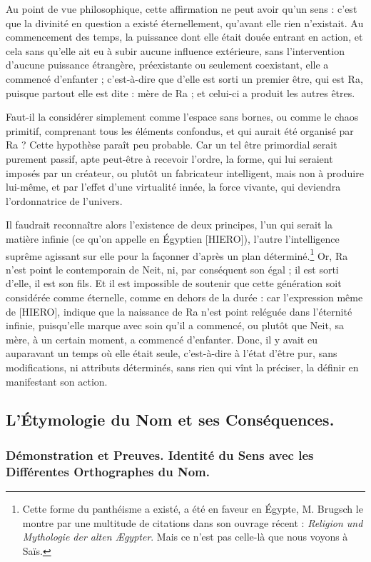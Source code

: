 \documentclass[a4paper, 11pt, oneside]{article}
\begin{document}
Au point de vue philosophique, cette affirmation ne peut avoir qu'un sens : c'est que la divinité en question a existé éternellement, qu'avant elle rien n'existait. Au commencement des temps, la puissance dont elle était douée entrant en action, et cela sans qu'elle ait eu à subir aucune influence extérieure, sans l'intervention d'aucune puissance étrangère, préexistante ou seulement coexistant, elle a commencé d'enfanter ; c'est-à-dire que d'elle est sorti un premier être, qui est Ra, puisque partout elle est dite : mère de Ra ; et celui-ci a produit les autres êtres.

Faut-il la considérer simplement comme l'espace sans bornes, ou comme le chaos primitif, comprenant tous les éléments confondus, et qui aurait été organisé par Ra ? Cette hypothèse paraît peu probable. Car un tel être primordial serait purement passif, apte peut-être à recevoir l'ordre, la forme, qui lui seraient imposés par un créateur, ou plutôt un fabricateur intelligent, mais non à produire lui-même, et par l'effet d'une virtualité innée, la force vivante, qui deviendra l'ordonnatrice de l'univers.

Il faudrait reconnaître alors l'existence de deux principes, l'un qui serait la matière infinie (ce qu'on appelle en Égyptien [HIERO]), l'autre l'intelligence suprême agissant sur elle pour la façonner d'après un plan déterminé.\footnote{Cette forme du panthéisme a existé, a été en faveur en Égypte, M. Brugsch le montre par une multitude de citations dans son ouvrage récent : \emph{Religion und Mythologie der alten Ægypter}. Mais ce n'est pas celle-là que nous voyons à Saïs.} Or, Ra n'est point le contemporain de Neit, ni, par conséquent son égal ; il est sorti d'elle, il est son fils. Et il est impossible de soutenir que cette génération soit considérée comme éternelle, comme en dehors de la durée : car l'expression même de [HIERO], indique que la naissance de Ra n'est point reléguée dans l'éternité infinie, puisqu'elle marque avec soin qu'il a commencé, ou plutôt que Neit, sa mère, à un certain moment, a commencé d'enfanter. Donc, il y avait eu auparavant un temps où elle était seule, c'est-à-dire à l'état d'être pur, sans modifications, ni attributs déterminés, sans rien qui vînt la préciser, la définir en manifestant son action.
\clearpage
\subsection{L'Étymologie du Nom et ses Conséquences.}
\subsubsection{Démonstration et Preuves. Identité du Sens avec les Différentes Orthographes du Nom.}
\end{document}
